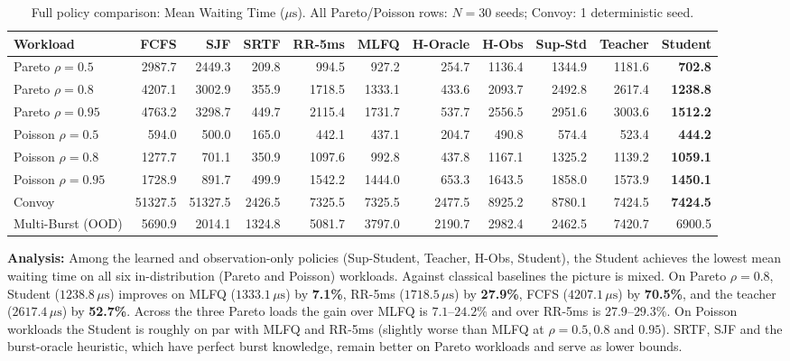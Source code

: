 \begin{table}[t]
  \centering
  \caption{Full policy comparison: Mean Waiting Time ($\mu\text{s}$). All
    Pareto/Poisson rows: $N = 30$ seeds; Convoy: 1 deterministic seed.}
  \label{tab:v4}
  \footnotesize
  \setlength{\tabcolsep}{6pt}
  \begin{tabular}{lrrrrrrrrrr}
    \toprule
    \textbf{Workload} & \textbf{FCFS} & \textbf{SJF} & \textbf{SRTF}
      & \textbf{RR-5ms} & \textbf{MLFQ} & \textbf{H-Oracle}
      & \textbf{H-Obs} & \textbf{Sup-Std} & \textbf{Teacher} & \textbf{Student} \\
    \midrule
    Pareto $\rho = 0.5$  & 2987.7 & 2449.3 &  209.8 &  994.5 &  927.2 & 254.7 & 1136.4 & 1344.9 & 1181.6 &  \textbf{702.8} \\
    Pareto $\rho = 0.8$  & 4207.1 & 3002.9 &  355.9 & 1718.5 & 1333.1 & 433.6 & 2093.7 & 2492.8 & 2617.4 & \textbf{1238.8} \\
    Pareto $\rho = 0.95$ & 4763.2 & 3298.7 &  449.7 & 2115.4 & 1731.7 & 537.7 & 2556.5 & 2951.6 & 3003.6 & \textbf{1512.2} \\
    Poisson $\rho = 0.5$ &  594.0 &  500.0 &  165.0 &  442.1 &  437.1 & 204.7 &  490.8 &  574.4 &  523.4 &  \textbf{444.2} \\
    Poisson $\rho = 0.8$ & 1277.7 &  701.1 &  350.9 & 1097.6 &  992.8 & 437.8 & 1167.1 & 1325.2 & 1139.2 & \textbf{1059.1} \\
    Poisson $\rho = 0.95$& 1728.9 &  891.7 &  499.9 & 1542.2 & 1444.0 & 653.3 & 1643.5 & 1858.0 & 1573.9 & \textbf{1450.1} \\
    Convoy               &51327.5 &51327.5 & 2426.5 & 7325.5 & 7325.5 &2477.5 & 8925.2 & 8780.1 & 7424.5 & \textbf{7424.5} \\
    Multi-Burst (OOD)    & 5690.9 & 2014.1 & 1324.8 & 5081.7 & 3797.0 &2190.7 & 2982.4 & 2462.5 & 7420.7 & 6900.5 \\
    \bottomrule
  \end{tabular}
\end{table}

\textbf{Analysis:} Among the learned and observation-only policies
(Sup-Student, Teacher, H-Obs, Student), the Student achieves the lowest mean
waiting time on all six in-distribution (Pareto and Poisson) workloads. Against
classical baselines the picture is mixed. On Pareto $\rho = 0.8$, Student
($1238.8\,\mu\text{s}$) improves on MLFQ ($1333.1\,\mu\text{s}$) by
\textbf{7.1\%}, RR-5ms ($1718.5\,\mu\text{s}$) by \textbf{27.9\%}, FCFS
($4207.1\,\mu\text{s}$) by \textbf{70.5\%}, and the teacher
($2617.4\,\mu\text{s}$) by \textbf{52.7\%}. Across the three Pareto loads the
gain over MLFQ is $7.1\text{--}24.2\%$ and over RR-5ms is
$27.9\text{--}29.3\%$. On Poisson workloads the Student is roughly on par with
MLFQ and RR-5ms (slightly worse than MLFQ at $\rho = 0.5, 0.8$ and $0.95$).
SRTF, SJF and the burst-oracle heuristic, which have perfect burst
knowledge, remain better on Pareto workloads and serve as lower bounds.

